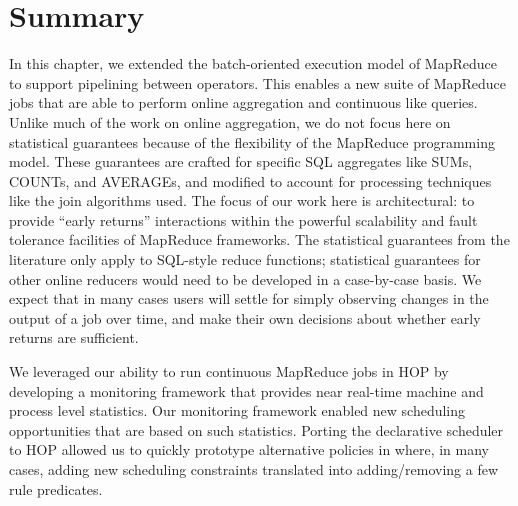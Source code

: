 \section{Summary}

In this chapter, we extended the batch-oriented execution model of MapReduce to
support pipelining between operators.  This enables a new suite of MapReduce
jobs that are able to perform online aggregation and continuous like queries.
Unlike much of the work on online aggregation, we do not focus here on
statistical guarantees because of the flexibility of the MapReduce programming
model.  These guarantees are crafted for specific SQL aggregates like SUMs,
COUNTs, and AVERAGEs, and modified to account for processing techniques like
the join algorithms used.  The focus of our work here is architectural: to
provide ``early returns'' interactions within the powerful scalability and
fault tolerance facilities of MapReduce frameworks.  The statistical guarantees
from the literature only apply to SQL-style reduce functions; statistical
guarantees for other online reducers would need to be developed in a
case-by-case basis.  We expect that in many cases users will settle for simply
observing changes in the output of a job over time, and make their own
decisions about whether early returns are sufficient.

We leveraged our ability to run continuous MapReduce jobs in HOP by developing
a monitoring framework that provides near real-time machine and process level
statistics.  Our monitoring framework enabled new scheduling opportunities that
are based on such statistics.  Porting the declarative scheduler to HOP allowed
us to quickly prototype alternative policies in \OVERLOG where, in many cases,
adding new scheduling constraints translated into adding/removing a few rule
predicates.



